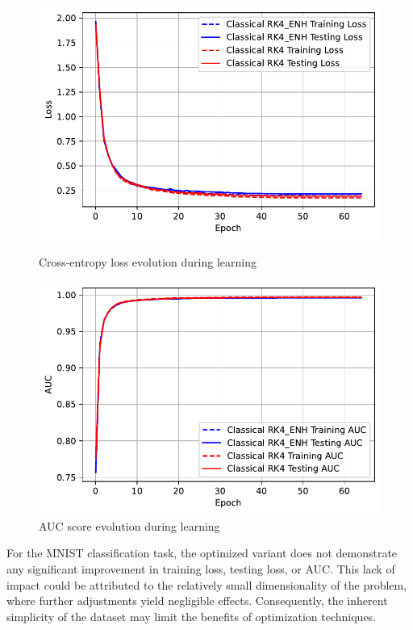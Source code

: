 \documentclass[12pt,a4paper]{report}
\begin{document}
\begin{figure}[th]
  \centering
  \includegraphics[scale=0.88]{./pics/new_pdf_graphs/classical/3_enc_1_rk_1_dec/classical_transfomer_loss_mnist_rk4_rk4_enh.pdf}
  \caption[Cross-entropy loss evolution during learning]{Cross-entropy loss evolution during learning}
  \label{fig:p17}
  \vspace*{\floatsep}
  \centering
  \includegraphics[scale=0.88]{./pics/new_pdf_graphs/classical/3_enc_1_rk_1_dec/classical_transfomer_auc_mnist_rk4_rk4_enh.pdf}
  \caption[AUC score evolution during learning]{AUC score evolution during learning}
  \label{fig:p18}
\end{figure}


For the MNIST classification task, the optimized variant does not demonstrate any significant improvement in training loss, testing loss, or AUC. This lack of impact could be attributed to the relatively small dimensionality of the problem, where further adjustments yield negligible effects. Consequently, the inherent simplicity of the dataset may limit the benefits of optimization techniques.
\end{document}
